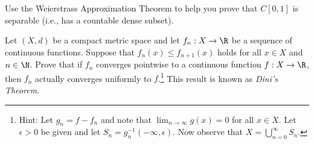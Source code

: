 \documentclass{homework}
\begin{document}
\begin{Exercise}
	Use the Weierstrass Approximation Theorem to help you prove that
  $C[0,1]$ is separable (i.e., has a countable dense subset).

  \begin{solution}

  \end{solution}
\end{Exercise}

\begin{Exercise}
	Let $(X,d)$ be a compact metric space and let $f_n: X \to \R$ be a
  sequence of continuous functions.  Suppose that
  $f_n(x) \leq f_{n+1}(x)$ holds for all $x \in X$ and $n \in \N$.
  Prove that if $f_n$ converges pointwise to a continuous function
  $f: X \to \R$, then $f_n$ actually converges uniformly to
  $f$.\footnote{Hint: Let $g_n = f - f_n$ and note that
    $\lim_{n\to\infty} g(x) = 0$ for all $x \in X$.  Let
    $\epsilon > 0$ be given and let
    $S_n = g_n^{-1}(-\infty,\epsilon)$.  Now observe that
    $X = \bigcup_{n=0}^{\infty} S_n$.}%
	This result is known as \emph{Dini's Theorem}.

  \begin{solution}

  \end{solution}
\end{Exercise}
\end{document}

